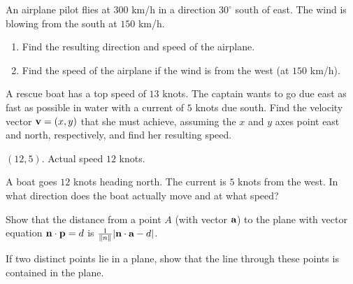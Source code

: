\begin{multicols}{2}
\begin{supex}
\begin{supsol}
\end{supsol}
\end{supex}

\begin{supex}
An airplane pilot flies at $300$ km/h in a direction $30^\circ$ south of east. The wind is blowing from the south at $150$ km/h.


\begin{enumerate}[label={\alph*.}]
\item Find the resulting direction and speed of the airplane.

\item Find the speed of the airplane if the wind is from the west (at $150$ km/h).

\end{enumerate}
\end{supex}

\begin{supex}
A rescue boat has a top speed of $13$ knots. The captain wants to go due east as fast as possible in water with a current of $5$ knots due south. 
Find the velocity vector $\textbf{v} = (x, y)$ that she must achieve, assuming the $x$ and $y$ axes point east and north, respectively, and find her resulting speed.

\begin{supsol}
$(12, 5)$. Actual speed $12$ knots.

\end{supsol}
\end{supex}

\columnbreak
\begin{supex}
A boat goes $12$ knots heading north. The current is $5$ knots from the west. In what direction does the boat actually move and at what speed?

\end{supex}

\begin{supex}
Show that the distance from a point $A$ (with vector $\textbf{a}$) to the plane with vector equation $\textbf{n} \cdot \textbf{p} = d$ is $\tfrac{1}{\| n \|}|\textbf{n} \cdot \textbf{a} - d|$.

\end{supex}

\begin{supex}
If two distinct points lie in a plane, show that the line through these points is contained in the plane.

\end{supex}


\end{multicols}
